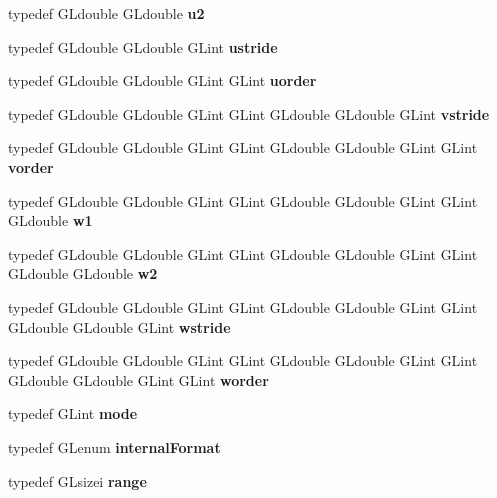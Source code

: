 \begin{DoxyCompactItemize}
\item 
typedef G\+Ldouble G\+Ldouble {\bfseries u2}\label{_s_d_l__opengl_8h_a1c6bf6fa786a04b729b30e56d68474ef}

\item 
typedef G\+Ldouble G\+Ldouble G\+Lint {\bfseries ustride}\label{_s_d_l__opengl_8h_a9fb9363e7d23824a7603a288729cf1ec}

\item 
typedef G\+Ldouble G\+Ldouble G\+Lint G\+Lint {\bfseries uorder}\label{_s_d_l__opengl_8h_a5aee3b53fbc52dbf6e3b023bc594653c}

\item 
typedef G\+Ldouble G\+Ldouble G\+Lint G\+Lint G\+Ldouble G\+Ldouble G\+Lint {\bfseries vstride}\label{_s_d_l__opengl_8h_a60703cfb6ea898d8d2bb036ef4c6b2d1}

\item 
typedef G\+Ldouble G\+Ldouble G\+Lint G\+Lint G\+Ldouble G\+Ldouble G\+Lint G\+Lint {\bfseries vorder}\label{_s_d_l__opengl_8h_acd4d2b309dae14d5210665bd1c47a5e3}

\item 
typedef G\+Ldouble G\+Ldouble G\+Lint G\+Lint G\+Ldouble G\+Ldouble G\+Lint G\+Lint G\+Ldouble {\bfseries w1}\label{_s_d_l__opengl_8h_ab5b747bf5adb1f9134337c30b9a4ce84}

\item 
typedef G\+Ldouble G\+Ldouble G\+Lint G\+Lint G\+Ldouble G\+Ldouble G\+Lint G\+Lint G\+Ldouble G\+Ldouble {\bfseries w2}\label{_s_d_l__opengl_8h_a1ca5aca787be24213d9591fdf074b094}

\item 
typedef G\+Ldouble G\+Ldouble G\+Lint G\+Lint G\+Ldouble G\+Ldouble G\+Lint G\+Lint G\+Ldouble G\+Ldouble G\+Lint {\bfseries wstride}\label{_s_d_l__opengl_8h_a45ed09c00679353c99521983f78a9203}

\item 
typedef G\+Ldouble G\+Ldouble G\+Lint G\+Lint G\+Ldouble G\+Ldouble G\+Lint G\+Lint G\+Ldouble G\+Ldouble G\+Lint G\+Lint {\bfseries worder}\label{_s_d_l__opengl_8h_add1fefb1be9f9351c426d1a58e7fe5f1}

\item 
typedef G\+Lint {\bfseries mode}\label{_s_d_l__opengl_8h_a1e71d9c196e4683cc06c4b54d53f7ef5}

\item 
typedef G\+Lenum {\bfseries internal\+Format}\label{_s_d_l__opengl_8h_adfa3e9c3e9fe1bf0a67a9e77a0bac5d8}

\item 
typedef G\+Lsizei {\bfseries range}\label{_s_d_l__opengl_8h_a7b8ad0b27a927682837f95528fa454f5}


\end{DoxyCompactItemize}
